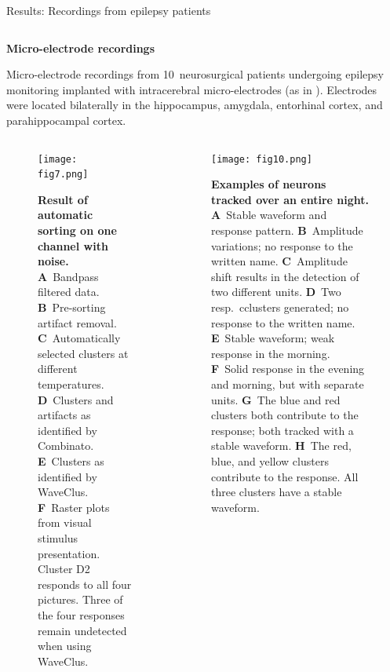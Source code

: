 \documentclass{beamer}
\renewcommand{\emph}{\textbf}
\newenvironment{wideitemize}{\itemize\addtolength{\itemsep}{.2em}\addtolength{\labelsep}{.1ex}}{\enditemize}
\begin{document}
\begin{frame}[t]
\begin{columns}[T]
\begin{column}{.49\linewidth}
\begin{block}{Results: Recordings from epilepsy patients}
\begin{columns}[T]
  \begin{column}{.95\linewidth}
    \vspace{-.5em}
\emph{Micro-electrode recordings}
\begin{wideitemize}
\item Micro-electrode recordings from 10~neurosurgical patients undergoing epilepsy monitoring implanted with intracerebral micro-electrodes (as in \cite{mormann_neurons_2015}).  Electrodes were located bilaterally in the hippocampus, amygdala, entorhinal cortex, and parahippocampal cortex.

\end{wideitemize}

  \begin{columns}[T]
    \begin{column}{.48\linewidth}
\begin{figure}[T]
  \begin{center}
    \texttt{[image: fig7.png]}
\end{center}
\caption{\emph{Result of automatic sorting on one channel with noise.} \textbf{A}~Bandpass filtered data. \textbf{B}~Pre-sorting artifact removal. \textbf{C}~Automatically selected clusters at different temperatures. \textbf{D}~Clusters and artifacts as identified by Combinato. \textbf{E}~Clusters as identified by WaveClus. \textbf{F}~Raster plots from visual stimulus presentation. Cluster D2 responds to all four pictures. Three of the four responses remain undetected when using WaveClus.}
\end{figure}

\end{column}

\begin{column}{.48\linewidth}
\begin{figure}[T]
  \texttt{[image: fig10.png]}
  
\caption{\emph{Examples of neurons tracked over an entire night.}
\textbf{A}~Stable waveform and response pattern.
\textbf{B}~Amplitude variations; no response to the written name.
\textbf{C}~Amplitude shift results in the detection of two different units.
\textbf{D}~Two resp.~cclusters generated; no response to the written name.
\textbf{E}~Stable waveform; weak response in the morning.
\textbf{F}~Solid response in the evening and morning, but with separate units. 
\textbf{G}~The blue and red clusters both contribute to the response; both tracked with a stable waveform.
\textbf{H}~The red, blue, and yellow clusters contribute to the response. All three clusters have a stable waveform.
}


\end{figure}
\end{column}
\end{columns}
\end{column}
\end{columns}
\end{block}
\end{column}
\end{columns}
\end{frame}
\end{document}
